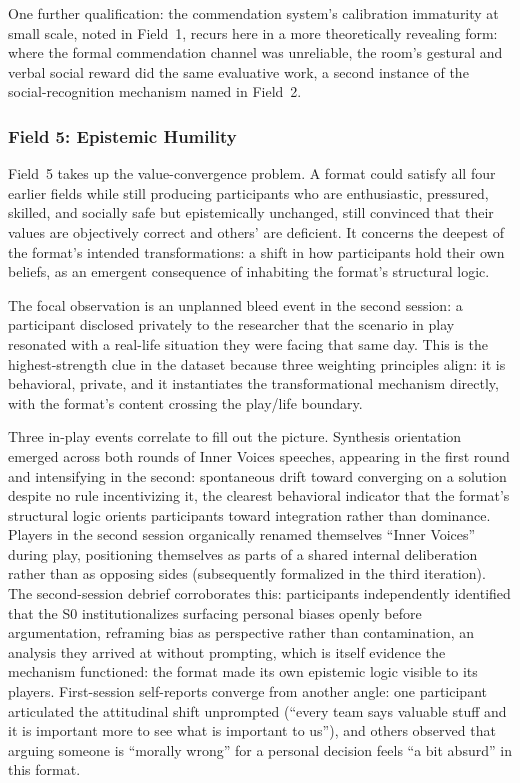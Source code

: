One further qualification: the commendation system's calibration immaturity at small scale, noted in Field~1, recurs here in a more theoretically revealing form: where the formal commendation channel was unreliable, the room's gestural and verbal social reward did the same evaluative work, a second instance of the social-recognition mechanism named in Field~2.

\subsubsection{Field 5: Epistemic Humility}

Field~5 takes up the value-convergence problem. A format could satisfy all four earlier fields while still producing participants who are enthusiastic, pressured, skilled, and socially safe but epistemically unchanged, still convinced that their values are objectively correct and others' are deficient. It concerns the deepest of the format's intended transformations: a shift in how participants hold their own beliefs, as an emergent consequence of inhabiting the format's structural logic.

The focal observation is an unplanned bleed event in the second session: a participant disclosed privately to the researcher that the scenario in play resonated with a real-life situation they were facing that same day. This is the highest-strength clue in the dataset because three weighting principles align: it is behavioral, private, and it instantiates the transformational mechanism directly, with the format's content crossing the play/life boundary.

Three in-play events correlate to fill out the picture. Synthesis orientation emerged across both rounds of Inner Voices speeches, appearing in the first round and intensifying in the second: spontaneous drift toward converging on a solution despite no rule incentivizing it, the clearest behavioral indicator that the format's structural logic orients participants toward integration rather than dominance. Players in the second session organically renamed themselves ``Inner Voices'' during play, positioning themselves as parts of a shared internal deliberation rather than as opposing sides (subsequently formalized in the third iteration). The second-session debrief corroborates this: participants independently identified that the S0 institutionalizes surfacing personal biases openly before argumentation, reframing bias as perspective rather than contamination, an analysis they arrived at without prompting, which is itself evidence the mechanism functioned: the format made its own epistemic logic visible to its players. First-session self-reports converge from another angle: one participant articulated the attitudinal shift unprompted (``every team says valuable stuff and it is important more to see what is important to us''), and others observed that arguing someone is ``morally wrong'' for a personal decision feels ``a bit absurd'' in this format.

